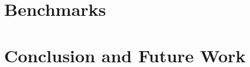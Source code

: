 \documentclass[a4paper,12pt,twoside]{book}
\begin{document}
\chapter{Benchmarks}

\chapter{Conclusion and Future Work}

\renewcommand{\bibname}{References}



% 
    
\end{document}
